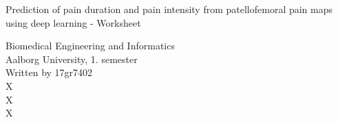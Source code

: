 \clearpage
\thispagestyle{empty}




\begin{center}
\vspace*{20\baselineskip}

{\huge Prediction of pain duration and pain intensity from patellofemoral pain maps using deep learning \vspace{0.3cm} \newline - Worksheet }\\[0.2\baselineskip] %

\vspace*{15\baselineskip}


\end{center} %
Biomedical Engineering and Informatics \\
Aalborg University, 1. semester \\
Written by 17gr7402 \\
{\color{white}X \\ X \\ X \\}

%	

